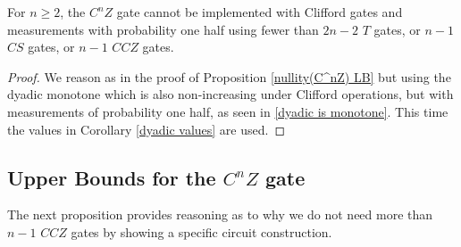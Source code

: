 \documentclass[12pt]{dalthesis}
\begin{document}
\begin{lemma}
\label{CCZ lowerbound}
For $n \geq 2$, the $C^n Z$ gate cannot be implemented with Clifford gates and measurements with probability one half using fewer than $2n-2$ $T$ gates, or $n-1$ $CS$ gates, or $n-1$ $CCZ$ gates.
\end{lemma}
\begin{proof}
We reason as in the proof of Proposition \ref{nullity(C^nZ) LB} but using the dyadic monotone which is also non-increasing under Clifford operations, but with measurements of probability one half, as seen in \ref{dyadic is monotone}. This time the values in Corollary \ref{dyadic values} are used.
\end{proof}

\subsection{Upper Bounds for the $C^nZ$ gate}
\label{Upper Bounds for C^nZ}

The next proposition provides reasoning as to why we do not need more than $n-1$ $CCZ$ gates by showing a specific circuit construction.
\end{document}
